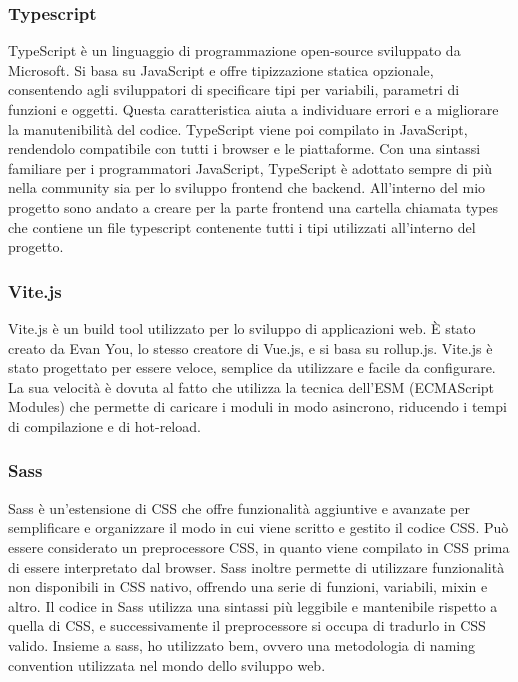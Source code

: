 \subsubsection{Typescript}\label{subsubsec:typescript}
TypeScript è un linguaggio di programmazione open-source sviluppato da Microsoft. Si basa su JavaScript e offre tipizzazione statica opzionale, 
consentendo agli sviluppatori di specificare tipi per variabili, parametri di funzioni e oggetti. Questa caratteristica aiuta a individuare errori e a migliorare 
la manutenibilità del codice. TypeScript viene poi compilato in JavaScript, rendendolo compatibile con tutti i browser e le piattaforme. 
Con una sintassi familiare per i programmatori JavaScript, TypeScript è adottato sempre di più nella community sia per lo sviluppo frontend che backend.
All'interno del mio progetto sono andato a creare per la parte frontend una cartella chiamata types che contiene un file typescript contenente tutti i tipi utilizzati all'interno del progetto.
\subsubsection{Vite.js}\label{subsubsec:vite}
Vite.js è un build tool utilizzato per lo sviluppo di applicazioni web. È stato creato da Evan You, lo stesso creatore di Vue.js, e si basa su rollup.js.
Vite.js è stato progettato per essere veloce, semplice da utilizzare e facile da configurare. La sua velocità è dovuta al fatto che utilizza la tecnica dell'ESM (ECMAScript Modules) 
che permette di caricare i moduli in modo asincrono, riducendo i tempi di compilazione e di hot-reload.
\subsubsection{Sass}\label{subsubsec:sass}
Sass è un'estensione di CSS che offre funzionalità aggiuntive e avanzate per semplificare e organizzare il modo in cui viene scritto e gestito il codice CSS.
Può essere considerato un preprocessore CSS, in quanto viene compilato in CSS prima di essere interpretato dal browser. Sass inoltre permette di utilizzare funzionalità non disponibili in CSS nativo, offrendo una serie di funzioni, variabili, mixin e altro.
Il codice in Sass utilizza una sintassi più leggibile e mantenibile rispetto a quella di CSS, 
e successivamente il preprocessore si occupa di tradurlo in CSS valido.
Insieme a sass, ho utilizzato bem, ovvero una metodologia di naming convention utilizzata nel mondo dello sviluppo web.

